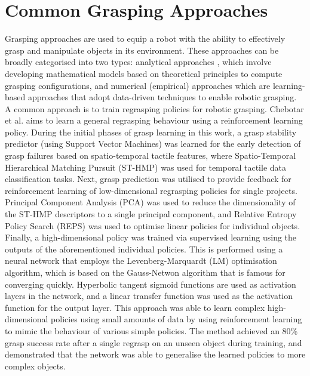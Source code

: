 \documentclass[11pt, a4paper]{report}
\begin{document}
\section{Common Grasping Approaches}
\label{sec:2.3}
Grasping approaches are used to equip a robot with the ability to effectively grasp and manipulate objects in its environment. These approaches can be broadly categorised into two types: analytical approaches \cite{ding2000, haschke2005}, which involve developing mathematical models based on theoretical principles to compute grasping configurations, and numerical (empirical) approaches \cite{Chebotar_2017, Calandra_2018, de_Farias_2021} which are learning-based approaches that adopt data-driven techniques to enable robotic grasping.\\

A common approach is to train regrasping policies for robotic grasping. Chebotar et al. \cite{Chebotar_2017} aims to learn a general regrasping behaviour using a reinforcement learning policy. During the initial phases of grasp learning in this work, a grasp stability predictor (using Support Vector Machines) was learned for the early detection of grasp failures based on spatio-temporal tactile features, where Spatio-Temporal Hierarchical Matching Pursuit (ST-HMP) was used for temporal tactile data classification tasks. Next, grasp prediction was utilised to provide feedback for reinforcement learning of low-dimensional regrasping policies for single projects. Principal Component Analysis (PCA) was used to reduce the dimensionality of the ST-HMP descriptors to a single principal component, and Relative Entropy Policy Search (REPS) was used to optimise linear policies for individual objects. Finally, a high-dimensional policy was trained via supervised learning using the outputs of the aforementioned individual policies. This is performed using a neural network that employs the Levenberg-Marquardt (LM) optimisation algorithm, which is based on the Gauss-Netwon algorithm that is famous for converging quickly. Hyperbolic tangent sigmoid functions are used as activation layers in the network, and a linear transfer function was used as the activation function for the output layer. This approach was able to learn complex high-dimensional policies using small amounts of data by using reinforcement learning to mimic the behaviour of various simple policies. The method achieved an 80\% grasp success rate after a single regrasp on an unseen object during training, and demonstrated that the network was able to generalise the learned policies to more complex objects.\\
\end{document}
